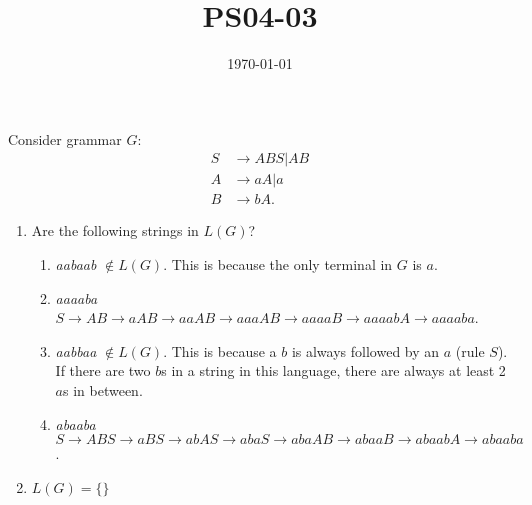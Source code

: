 \documentclass{article}
\title{PS04-03}
\date{\today}
\begin{document}
\maketitle
Consider grammar $G$:
\begin{align*}
    S &\rightarrow ABS | AB\\
    A &\rightarrow aA | a\\
    B &\rightarrow bA.
\end{align*}

\begin{enumerate}[label=\alph*.]
    \item Are the following strings in $L(G)$?
    \begin{enumerate}[label=\roman*.]
        \item \textit{aabaab} $\notin L(G)$. This is because the only terminal in $G$ is $a$.
        \item \textit{aaaaba} $S \rightarrow AB \rightarrow aAB \rightarrow aaAB \rightarrow aaaAB \rightarrow aaaaB \rightarrow aaaabA \rightarrow aaaaba$.
        \item \textit{aabbaa} $\notin L(G)$. This is because a $b$ is always
        followed by an $a$ (rule $S$). If there are two $b$s in a string in
        this language, there are always at least 2 $a$s in between.
        \item \textit{abaaba} $S \rightarrow ABS \rightarrow aBS \rightarrow abAS \rightarrow abaS \rightarrow abaAB \rightarrow abaaB \rightarrow abaabA \rightarrow abaaba$.
    \end{enumerate}
    \item $L(G) = \{\}$ %
\end{enumerate}
\end{document}
